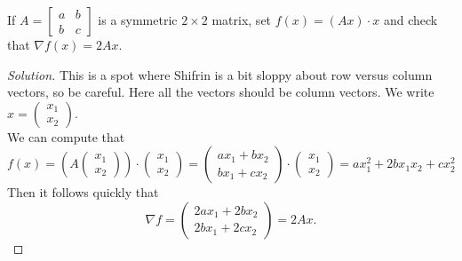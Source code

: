 \documentclass[Shifrin_Solutions_Spring_2018.tex]{subfiles}
\begin{document}
\vspace{1cm}


\begin{exercise} If $A = \begin{bmatrix} a & b \\ b & c \end{bmatrix}$ is a symmetric $2 \times 2$ matrix, set $f(x) = (Ax) \cdot x$ and check that $\nabla f (x) = 2 A x$.
 \end{exercise}

\begin{proof}[Solution] This is a spot where Shifrin is a bit sloppy about row versus column vectors, so be careful. Here all the vectors should be column vectors. We write $x = \begin{pmatrix} x_1 \\ x_2 \end{pmatrix}$.\\
We can compute that
\[
f(x) =\left( A \begin{pmatrix} x_1 \\ x_2 \end{pmatrix}\right) \cdot \begin{pmatrix} x_1 \\ x_2 \end{pmatrix}= \begin{pmatrix} ax_1+bx_2 \\ bx_1 + cx_2 \end{pmatrix} \cdot \begin{pmatrix} x_1 \\ x_2 \end{pmatrix} =  a x_1^2 + 2b x_1x_2 + cx_2^2
\]
 Then it follows quickly that
\[
\nabla f = \begin{pmatrix} 2ax_1 + 2bx_2 \\ 2bx_1 + 2cx_2 \end{pmatrix} = 2 Ax .
\]
\end{proof}
\end{document}
